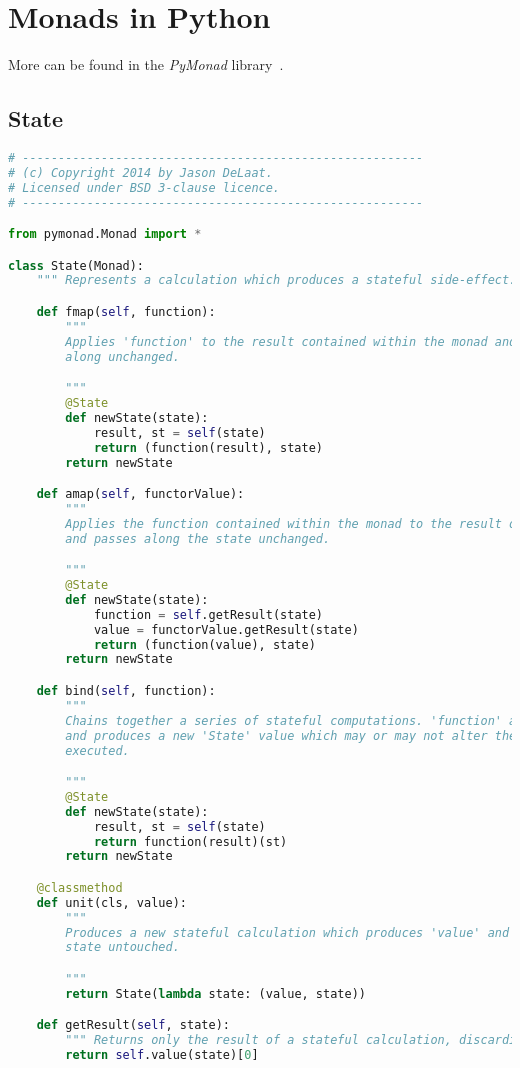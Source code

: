 \chapter{Monads in Python}\label{app:monadspython}
More can be found in the \emph{PyMonad} library~\cite{pymonadlibrary}.

\section{State}
\begin{lstlisting}[language=Python]
# --------------------------------------------------------
# (c) Copyright 2014 by Jason DeLaat.
# Licensed under BSD 3-clause licence.
# --------------------------------------------------------

from pymonad.Monad import *

class State(Monad):
	""" Represents a calculation which produces a stateful side-effect.  """

	def fmap(self, function):
		"""
		Applies 'function' to the result contained within the monad and passes the state
		along unchanged.

		"""
		@State
		def newState(state):
			result, st = self(state)
			return (function(result), state)
		return newState

	def amap(self, functorValue):
		"""
		Applies the function contained within the monad to the result of 'functorValue'
		and passes along the state unchanged.

		"""
		@State
		def newState(state):
			function = self.getResult(state)
			value = functorValue.getResult(state)
			return (function(value), state)
		return newState

	def bind(self, function):
		"""
		Chains together a series of stateful computations. 'function' accepts a single value
		and produces a new 'State' value which may or may not alter the state when it is
		executed.

		"""
		@State
		def newState(state):
			result, st = self(state)
			return function(result)(st)
		return newState

	@classmethod
	def unit(cls, value):
		"""
		Produces a new stateful calculation which produces 'value' and leaves the passed in
		state untouched.

		"""
		return State(lambda state: (value, state))

	def getResult(self, state):
		""" Returns only the result of a stateful calculation, discarding the state. """
		return self.value(state)[0]


\end{lstlisting}
